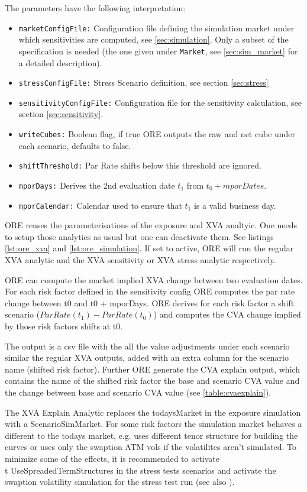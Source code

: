 {The parameters have the following interpretation:

\begin{itemize}
\item {\tt marketConfigFile:} Configuration file defining the simulation market under which sensitivities are computed,
  see \ref{sec:simulation}. Only a subset of the specification is needed (the one given under {\tt Market}, see
  \ref{sec:sim_market} for a detailed description).
  \item {\tt stressConfigFile:} Stress Scenario definition, see section \ref{sec:stress}
  \item {\tt sensitivityConfigFile:} Configuration file  for the sensitivity calculation, see section \ref{sec:sensitivity}.
  \item {\tt writeCubes:} Boolean flag, if true ORE outputs the raw and net cube under each scenario, defaults to false.
  \item {\tt shiftThreshold:} Par Rate shifts below this threshold are ignored.
  \item {\tt mporDays:} Derives the 2nd evaluation date $t_1$ from $t_0 + mporDates$.
  \item {\tt mporCalendar:} Calendar used to ensure that $t_1$ is a valid business day. 
\end{itemize}

ORE reuses the parameterisations of the exposure and XVA analtyic. One needs to setup those analytics as usual but one
can deactivate them. See listings \ref{lst:ore_xva} and \ref{lst:ore_simulation}. If set to active, ORE will run the 
regular XVA analytic and the XVA sensitivity or XVA stress analytic respectively.

ORE can compute the market implied XVA change between two evaluation dates. For each risk factor defined in the sensitivity 
config ORE computes the par rate change between t0 and t0 + mporDays. 
ORE derives for each risk factor a shift scenario ($ParRate(t_1) - ParRate(t_0)$) and computes the CVA change implied by
those risk factors shifts at t0.

The output is a csv file with the all the value adjustments under each scenario similar the regular XVA outputs,
added with an extra column for the scenario name (shifted risk factor). Further ORE generate the CVA explain output,
which contains the name of the shifted risk factor the base and scenario CVA value and the change between base and 
scenario CVA value (see \ref{table:cvaexplain}).

The XVA Explain Analytic replaces the todaysMarket in the exposure simulation with a ScenarioSimMarket. 
For some risk factors the simulation market behaves a different to the todays market, e.g. uses different tenor structure
for building the curves or uses only the swaption ATM vols if the volatilites aren't simulated. To minimize some of
the effects, it is recommended to activate {\\t UseSpreadedTermStructures} in the stress tests scenarios 
and activate the swaption volatility simulation for the stress test run (see also \cite{methods}).

}
